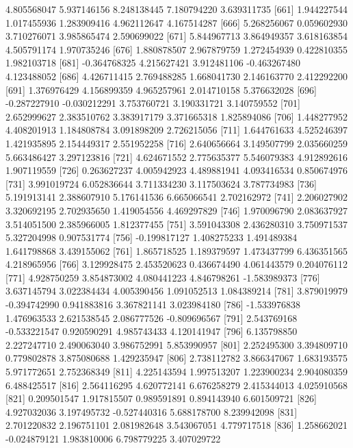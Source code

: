 \documentclass[12pt]{article}
\begin{document}
\begin{Schunk}
\begin{Soutput}
 [656]  4.805568047  5.937146156  8.248138445  7.180794220  3.639311735
 [661]  1.944227544  1.017455936  1.283909416  4.962112647  4.167514287
 [666]  5.268256067  0.059602930  3.710276071  3.985865474  2.590699022
 [671]  5.844967713  3.864949357  3.618163854  4.505791174  1.970735246
 [676]  1.880878507  2.967879759  1.272454939  0.422810355  1.982103718
 [681] -0.364768325  4.215627421  3.912481106 -0.463267480  4.123488052
 [686]  4.426711415  2.769488285  1.668041730  2.146163770  2.412292200
 [691]  1.376976429  4.156899359  4.965257961  2.014710158  5.376632028
 [696] -0.287227910 -0.030212291  3.753760721  3.190331721  3.140759552
 [701]  2.652999627  2.383510762  3.383917179  3.371665318  1.825894086
 [706]  1.448277952  4.408201913  1.184808784  3.091898209  2.726215056
 [711]  1.644761633  4.525246397  1.421935895  2.154449317  2.551952258
 [716]  2.640656664  3.149507799  2.035660259  5.663486427  3.297123816
 [721]  4.624671552  2.775635377  5.546079383  4.912892616  1.907119559
 [726]  0.263627237  4.005942923  4.489881941  4.093416534  0.850674976
 [731]  3.991019724  6.052836644  3.711334230  3.117503624  3.787734983
 [736]  5.191913141  2.388607910  5.176141536  6.665066541  2.702162972
 [741]  2.206027902  3.320692195  2.702935650  1.419054556  4.469297829
 [746]  1.970096790  2.083637927  3.514051500  2.385966005  1.812377455
 [751]  3.591043308  2.436280310  3.750971537  5.327204998  0.907531774
 [756] -0.199817127  1.408275233  1.491489384  1.641798868  3.439155062
 [761]  1.865718525  1.189379597  1.473437799  6.436351565  4.218965956
 [766]  3.129928475  2.453520623  0.436674490  4.061443579  0.204076112
 [771]  4.928750259  3.854873002  4.080441223  4.846798261 -1.583989373
 [776]  3.637145794  3.022384434  4.005390456  1.091052513  1.084389214
 [781]  3.879019979 -0.394742990  0.941883816  3.367821141  3.023984180
 [786] -1.533976838  1.476963533  2.621538545  2.086777526 -0.809696567
 [791]  2.543769168 -0.533221547  0.920590291  4.985743433  4.120141947
 [796]  6.135798850  2.227247710  2.490063040  3.986752991  5.853990957
 [801]  2.252495300  3.394809710  0.779802878  3.875080688  1.429235947
 [806]  2.738112782  3.866347067  1.683193575  5.971772651  2.752368349
 [811]  4.225143594  1.997513207  1.223900234  2.904080359  6.488425517
 [816]  2.564116295  4.620772141  6.676258279  2.415344013  4.025910568
 [821]  0.209501547  1.917815507  0.989591891  0.894143940  6.601509721
 [826]  4.927032036  3.197495732 -0.527440316  5.688178700  8.239942098
 [831]  2.701220832  2.196751101  2.081982648  3.543067051  4.779717518
 [836]  1.258662021 -0.024879121  1.983810006  6.798779225  3.407029722

\end{Soutput}
\end{Schunk}
\end{document}
